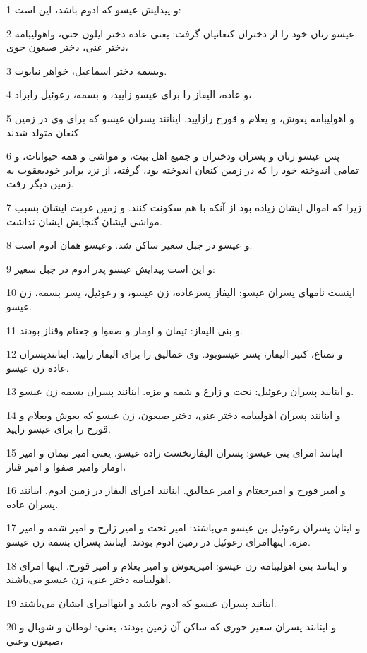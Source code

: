 \par 1 و پیدایش عیسو که ادوم باشد، این است:
\par 2 عیسو زنان خود را از دختران کنعانیان گرفت: یعنی عاده دختر ایلون حتی، واهولیبامه دختر عنی، دختر صبعون حوی،
\par 3 وبسمه دختر اسماعیل، خواهر نبایوت.
\par 4 و عاده، الیفاز را برای عیسو زایید، و بسمه، رعوئیل رابزاد،
\par 5 و اهولیبامه یعوش، و یعلام و قورح رازایید. اینانند پسران عیسو که برای وی در زمین کنعان متولد شدند.
\par 6 پس عیسو زنان و پسران ودختران و جمیع اهل بیت، و مواشی و همه حیوانات، و تمامی اندوخته خود را که در زمین کنعان اندوخته بود، گرفته، از نزد برادر خودیعقوب به زمین دیگر رفت.
\par 7 زیرا که اموال ایشان زیاده بود از آنکه با هم سکونت کنند. و زمین غربت ایشان بسبب مواشی ایشان گنجایش ایشان نداشت.
\par 8 و عیسو در جبل سعیر ساکن شد. وعیسو همان ادوم است.
\par 9 و این است پیدایش عیسو پدر ادوم در جبل سعیر:
\par 10 اینست نامهای پسران عیسو: الیفاز پسرعاده، زن عیسو، و رعوئیل، پسر بسمه، زن عیسو.
\par 11 و بنی الیفاز: تیمان و اومار و صفوا و جعتام وقناز بودند.
\par 12 و تمناع، کنیز الیفاز، پسر عیسوبود. وی عمالیق را برای الیفاز زایید. اینانندپسران عاده زن عیسو.
\par 13 و اینانند پسران رعوئیل: نحت و زارع و شمه و مزه. اینانند پسران بسمه زن عیسو.
\par 14 و اینانند پسران اهولیبامه دختر عنی، دختر صبعون، زن عیسو که یعوش ویعلام و قورح را برای عیسو زایید.
\par 15 اینانند امرای بنی عیسو: پسران الیفازنخست زاده عیسو، یعنی امیر تیمان و امیر اومار وامیر صفوا و امیر قناز،
\par 16 و امیر قورح و امیرجعتام و امیر عمالیق. اینانند امرای الیفاز در زمین ادوم. اینانند پسران عاده.
\par 17 و اینان پسران رعوئیل بن عیسو می‌باشند: امیر نحت و امیر زارح و امیر شمه و امیر مزه. اینهاامرای رعوئیل در زمین ادوم بودند. اینانند پسران بسمه زن عیسو.
\par 18 و اینانند بنی اهولیبامه زن عیسو: امیریعوش و امیر یعلام و امیر قورح. اینها امرای اهولیبامه دختر عنی، زن عیسو می‌باشند.
\par 19 اینانند پسران عیسو که ادوم باشد و اینهاامرای ایشان می‌باشند.
\par 20 و اینانند پسران سعیر حوری که ساکن آن زمین بودند، یعنی: لوطان و شوبال و صبعون وعنی،
